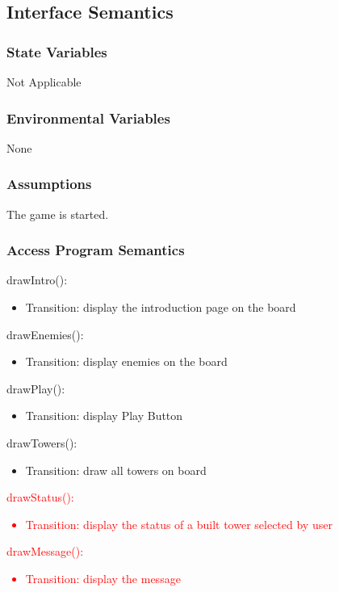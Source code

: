\documentclass[12,english]{article}
\begin{document}
\subsection{Interface Semantics}
\subsubsection{State Variables}
Not Applicable 
\subsubsection{Environmental Variables}
None
\subsubsection{Assumptions}
The game is started. 
\subsubsection{Access Program Semantics}

\noindent drawIntro():
\begin{itemize}
    \item Transition: display the introduction page on the board
\end{itemize}

\noindent drawEnemies():
\begin{itemize}
    \item Transition: display enemies on the board
\end{itemize}

\noindent drawPlay():
\begin{itemize}
    \item Transition: display Play Button
\end{itemize}

\noindent drawTowers():
\begin{itemize}
    \item Transition: draw all towers on board
\end{itemize}

\noindent \textcolor{red}{drawStatus():}
\textcolor{red}{\begin{itemize}
    \item Transition: display the status of a built tower selected by user
\end{itemize}}

\noindent \textcolor{red}{drawMessage():}
\textcolor{red}{\begin{itemize}
    \item Transition: display the message
\end{itemize}}
\end{document}
